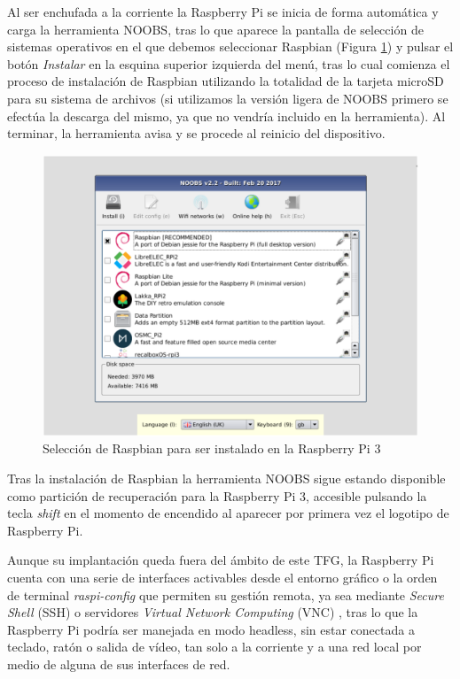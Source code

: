\begin{appendices}
Al ser enchufada a la corriente la Raspberry Pi se inicia de forma automática y carga la herramienta NOOBS, tras lo que aparece la pantalla de selección de sistemas operativos en el que debemos seleccionar Raspbian (Figura \ref{NOOBS}) y pulsar el botón \emph{Instalar} en la esquina superior izquierda del menú, tras lo cual comienza el proceso de instalación de Raspbian utilizando la totalidad de la tarjeta microSD para su sistema de archivos (si utilizamos la versión ligera de NOOBS primero se efectúa la descarga del mismo, ya que no vendría incluido en la herramienta). Al terminar, la herramienta avisa y se procede al reinicio del dispositivo.

\begin{figure}[!t]
\begin{center}
\includegraphics[width=0.75\linewidth]{./X_Anexos/Img/NOOBS.png}
\end{center}
\caption{Selección de Raspbian para ser instalado en la Raspberry Pi 3}
\label{NOOBS}
\end{figure}

Tras la instalación de Raspbian la herramienta NOOBS sigue estando disponible como partición de recuperación para la Raspberry Pi 3, accesible pulsando la tecla \emph{shift} en el momento de encendido al aparecer por primera vez el logotipo de Raspberry Pi.

Aunque su implantación queda fuera del ámbito de este TFG, la Raspberry Pi cuenta con una serie de interfaces activables desde el entorno gráfico o la orden de terminal \emph{raspi-config} que permiten su gestión remota, ya sea mediante \emph{Secure Shell} (\acrshort{SSH}) o servidores \emph{Virtual Network Computing} (\acrshort{VNC}) \cite{RasPiVNC}, tras lo que la Raspberry Pi podría ser manejada en modo headless, sin estar conectada a teclado, ratón o salida de vídeo, tan solo a la corriente y a una red local por medio de alguna de sus interfaces de red.


\end{appendices}
